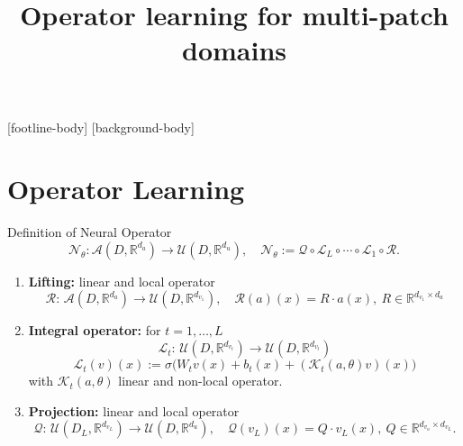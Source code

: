 \documentclass{beamer}
\title{Operator learning \newline for multi-patch domains}
\subtitle{}
\newcommand{\numberset}{\mathbb}
\newcommand{\R}{\numberset{R}}
\begin{document}
\frame{\titlepage}

\addtocounter{framenumber}{-1}
[footline-body]
[background-body]


\section{Operator Learning}


\begin{frame}[t]{Definition of Neural Operator}
	\vspace{-0.5cm}
	\[ \mathcal{N}_{\theta} :\mathcal{A}(D, \R^{d_a}) \to \mathcal{U}(D, \R^{d_{u}}), \quad	\mathcal{N}_{\theta} := \mathcal{Q} \circ \mathcal{L}_L \circ \cdots \circ \mathcal{L}_1 \circ \mathcal{R} . \]
	\vspace{-0.2cm}
	\begin{enumerate}
		\item \textbf{Lifting:} linear and local operator 
			\[\mathcal{R}:\, \mathcal{A}(D, \R^{d_a}) \to \mathcal{U}(D, \R^{d_{v_1}}), \quad  \mathcal{R}(a)(x) = R\cdot a(x), \ R \in \R^{d_{v_1} \times d_a} \]
	\vspace{-0.2cm}
		\pause
		\item \textbf{Integral operator:} for $ t = 1, \dots, L $
		\[ \mathcal{L}_t : \, \mathcal{U}(D, \R^{d_{v_t}}) \to  \mathcal{U}(D, \R^{d_{v_{t}}}) \]
		\[  \mathcal{L}_t(v)(x) := \sigma\Big( W_t v(x)+ b_t(x) + (\mathcal{K}_t(a, \theta) v)(x) \Big) \]
		with $ \mathcal{K}_t(a, \theta) $ linear and non-local operator.  
		\pause
		\item \textbf{Projection:} linear and local operator 
		\[\mathcal{Q}:\, \mathcal{U}(D_{L}, \R^{d_{v_L}}) \to  \mathcal{U}(D, \R^{d_{u}}), \quad  \mathcal{Q}(v_L)(x) = Q\cdot v_L(x), \ Q \in \R^{d_{v_u} \times d_{v_L}}. \]		
	\end{enumerate}
\end{frame}

\end{document}
